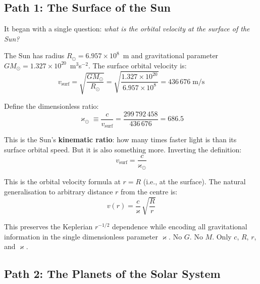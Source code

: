 \documentclass[twocolumn,epjc3]{svjour3}
\newcommand{\kop}{\varkappa}  %
\begin{document}
\subsection{Path 1: The Surface of the Sun}
\label{sec:path1}

It began with a single question: \emph{what is the orbital velocity at the surface of the Sun?}

The Sun has radius $R_\odot = 6.957 \times 10^8$~m and gravitational parameter $GM_\odot = 1.327 \times 10^{20}$~m$^3$s$^{-2}$.  The surface orbital velocity is:
\begin{equation}
  v_{\text{surf}} = \sqrt{\frac{GM_\odot}{R_\odot}} = \sqrt{\frac{1.327 \times 10^{20}}{6.957 \times 10^{8}}} = 436\,676\;\text{m/s}
\end{equation}

Define the dimensionless ratio:
\begin{equation}\label{eq:k-sun}
  \kop_\odot \equiv \frac{c}{v_{\text{surf}}} = \frac{299\,792\,458}{436\,676} = 686.5
\end{equation}

This is the Sun's \textbf{kinematic ratio}: how many times faster light is than its surface orbital speed.  But it is also something more.  Inverting the definition:
\begin{equation}\label{eq:v-from-k}
  v_{\text{surf}} = \frac{c}{\kop_\odot}
\end{equation}

This is the orbital velocity formula at $r = R$ (i.e., at the surface).  The natural generalisation to arbitrary distance $r$ from the centre is:
\begin{equation}\label{eq:v-general}
  \boxed{v(r) = \frac{c}{\kop}\,\sqrt{\frac{R}{r}}}
\end{equation}

This preserves the Keplerian $r^{-1/2}$ dependence while encoding all gravitational information in the single dimensionless parameter $\kop$.  No $G$.  No $M$.  Only $c$, $R$, $r$, and $\kop$.


\subsection{Path 2: The Planets of the Solar System}
\label{sec:path2}
\end{document}

